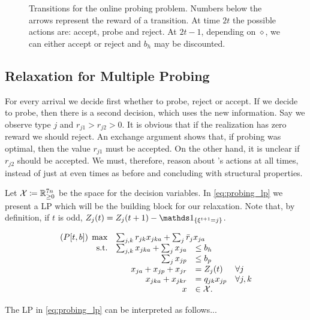 \begin{figure}
\centering
\scalebox{0.7}{%

}
\caption{Transitions for the online probing problem. 
Numbers below the arrows represent the reward of a transition.
At time $2t$ the possible actions are: accept, probe and reject.
At $2t-1$, depending on $\diamond$, we can either accept or reject and $b_h$ may be discounted.
}
\label{fig:probing_states}
\end{figure}


\subsection{Relaxation for Multiple Probing}

For every arrival we decide first whether to probe, reject or accept.
If we decide to probe, then there is a second decision, which uses the new information.
Say we observe type $j$ and $r_{j1}>r_{j2}>0$.
It is obvious that if the realization has zero reward we should reject.
An exchange argument shows that, if probing was optimal, then the value $r_{j1}$ must be accepted.
On the other hand, it is unclear if $r_{j2}$ should be accepted.
We must, therefore, reason about \off's actions at all times, instead of just at even times as before and concluding with structural properties.

Let $\mathcal{X}\coloneqq\mathbb{R}_{\geq 0}^{7n}$ be the space for the decision variables.
In \cref{eq:probing_lp} we present a LP which will be the building block for our relaxation.
Note that, by definition, if $t$ is odd, $Z_j(t)=Z_j(t+1)-\In{\xi^{t+1}=j}$.

\begin{equation}\label{eq:probing_lp}
\begin{array}{rrll}
(P[t,b]) \; \max & \multicolumn{3}{l}{\sum_{j,k}r_{jk}x_{jka}+ \sum_j \bar r_jx_{ja}} \\
\text{s.t.}& \sum_{j,k}x_{jka}+\sum_jx_{ja} &\leq b_h  \\
&  \sum_j x_{jp} & \leq b_p   \\
&  x_{ja} +x_{jp} + x_{jr}&= Z_j(t)  & \forall j \\
& x_{jka} +x_{jkr} &= q_{jk}x_{jp} &  \forall j,k\\ 
& x&\in\calX.
\end{array}
\end{equation}

The LP in \cref{eq:probing_lp} can be interpreted as follows...\todonote

